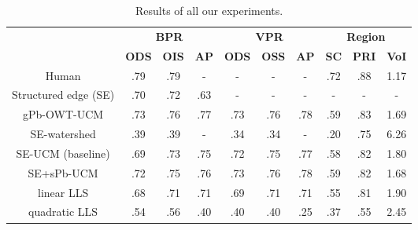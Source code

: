 \begin{table}[htbp]
\renewcommand{\arraystretch}{1.3}
\centering
\scriptsize
\begin{tabular}{l|c|c|c||c|c|c||c|c|c|}
\cline{2-10} %
\multirow{2}{*}{} & \multicolumn{3}{c||}{\textbf{BPR}} & \multicolumn{3}{c||}{\textbf{VPR}}& \multicolumn{3}{c|}{\textbf{Region}}\\
\cline{2-10}
& \textbf{ODS}  & \textbf{OIS} & \textbf{AP} %
& \textbf{ODS} & \textbf{OSS} & \textbf{AP} %
& \textbf{SC} & \textbf{PRI} & \textbf{VoI} \\
\hline
\multicolumn{1}{|c|}{Human} & .79 & .79 & - & - & - & - & .72 & .88 & 1.17 \\ %
\hline
\hline
\multicolumn{1}{|c|}{\cite{DollarICCV13edges} Structured edge (SE)} & .70 & .72 & .63 & - & - & - & - & - & - \\
\hline
\multicolumn{1}{|c|}{\cite{Arbelaez11} gPb-OWT-UCM} & .73 & .76 & .77 & .73 & .76 & .78 & .59 & .83 & 1.69 \\
\hline
\hline
\multicolumn{1}{|c|}{SE-watershed} & .39 & .39 & - & .34 & .34 & - & .20 & .75 & 6.26 \\
\hline
\multicolumn{1}{|c|}{SE-UCM (baseline)} & .69 &.73 & .75 & .72 & .75 & .77 & .58 & .82 & 1.80 \\
\hline
\multicolumn{1}{|c|}{SE+sPb-UCM} & .72 & .75 & .76 & .73 & .76 & .78 & .59 & .82 & 1.68 \\ %
\hline
\hline
\multicolumn{1}{|c|}{linear LLS} & .68 & .71 & .71 & .69 & .71 & .71 & .55 & .81 & 1.90 \\%
\hline
\multicolumn{1}{|c|}{quadratic LLS} & .54 & .56 & .40 & .40 & .40 & .25 & .37 & .55 & 2.45 \\
\hline
\hline
\end{tabular}
\caption[All results]{Results of all our experiments.}
\label{tab:all-results}
\end{table}



